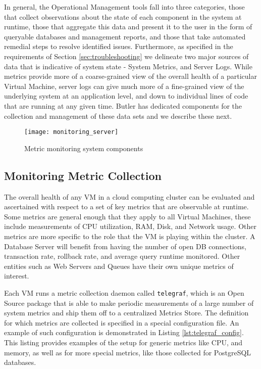 In general, the Operational Management tools fall into three categories, those that collect observations about the state of each component in the system at runtime, those that aggregate this data and present it to the user in the form of queryable databases and management reports, and those that take automated remedial steps to resolve identified issues. Furthermore, as specified in the requirements of Section \ref{sec:troubleshooting} we delineate two major sources of data that is indicative of system state - System Metrics, and Server Logs. While metrics provide more of a coarse-grained view of the overall health of a particular Virtual Machine, server logs can give much more of a fine-grained view of the underlying system at an application level, and down to individual lines of code that are running at any given time. Butler has dedicated components for the collection and management of these data sets and we describe these next.

\begin{figure}[h]
\texttt{[image: monitoring\_server]}
\centering
\caption {Metric monitoring system components}
\label{fig:monitoring_server}
\end{figure}

\subsection{Monitoring Metric Collection}

The overall health of any VM in a cloud computing cluster can be evaluated and ascertained with respect to a set of key metrics that are observable at runtime. Some metrics are general enough that they apply to all Virtual Machines, these include measurements of CPU utilization, RAM, Disk, and Network usage. Other metrics are more specific to the role that the VM is playing within the cluster. A Database Server will benefit from having the number of open DB connections, transaction rate, rollback rate, and average query runtime monitored. Other entities such as Web Servers and Queues have their own unique metrics of interest.

Each VM runs a metric collection daemon called \texttt{telegraf}\autocite{telegraf}, which is an Open Source package that is able to make periodic measurements of a large number of system metrics and ship them off to a centralized Metrics Store. The definition for which metrics are collected is specified in a special configuration file. An example of such configuration is demonstrated in Listing \ref{lst:telegraf_config}. This listing provides examples of the setup for generic metrics like CPU, and memory, as well as for more special metrics, like those collected for PostgreSQL databases.

